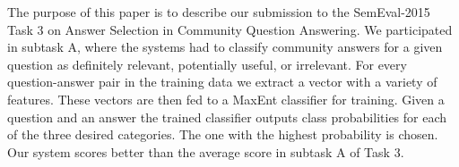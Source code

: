 The purpose of this paper is to describe our submission to the SemEval-2015 Task 3 on Answer Selection in Community Question Answering. We participated in subtask A, where the systems had to classify community answers for a given question as definitely relevant, potentially useful, or irrelevant. For every question-answer pair in the training data we extract a vector with a variety of features. These vectors are then fed to a MaxEnt classifier for training. Given a question and an answer the trained classifier outputs class probabilities for each of the three desired categories. The one with the highest probability is chosen. Our system scores better than the average score in subtask A of Task 3.
